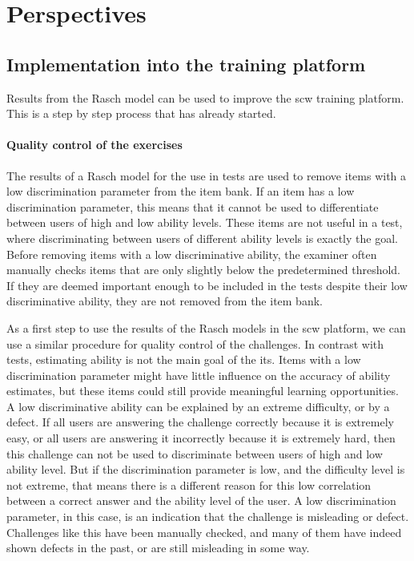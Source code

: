 \section{Perspectives}
\label{sec:its-perspectives}

\subsection{Implementation into the training platform}
Results from the Rasch model can be used to improve the \gls{scw} training platform.
This is a step by step process that has already started.

\paragraph{Quality control of the exercises}
The results of a Rasch model for the use in tests are used to remove items with a low discrimination parameter from the item bank. 
If an item has a low discrimination parameter, this means that it cannot be used to differentiate between users of high and low ability levels.
These items are not useful in a test, where discriminating between users of different ability levels is exactly the goal.
Before removing items with a low discriminative ability, the examiner often manually checks items that are only slightly below the predetermined threshold.
If they are deemed important enough to be included in the tests despite their low discriminative ability, they are not removed from the item bank.

As a first step to use the results of the Rasch models in the \gls{scw} platform, we can use a similar procedure for quality control of the challenges.
In contrast with tests, estimating ability is not the main goal of the \gls{its}.
Items with a low discrimination parameter might have little influence on the accuracy of ability estimates, but these items could still provide meaningful learning opportunities.
A low discriminative ability can be explained by an extreme difficulty, or by a defect.
If all users are answering the challenge correctly because it is extremely easy, or all users are answering it incorrectly because it is extremely hard, then this challenge can not be used to discriminate between users of high and low ability level.
But if the discrimination parameter is low, and the difficulty level is not extreme, that means there is a different reason for this low correlation between a correct answer and the ability level of the user.
A low discrimination parameter, in this case, is an indication that the challenge is misleading or defect.
Challenges like this have been manually checked, and many of them have indeed shown defects in the past, or are still misleading in some way.


